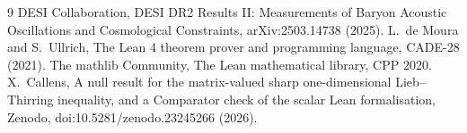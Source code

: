 \documentclass[11pt]{article}
\theoremstyle{remark}
\begin{document}
\begin{thebibliography}{9}
 DESI Collaboration, DESI DR2 Results II: Measurements of Baryon Acoustic Oscillations and Cosmological Constraints,
arXiv:2503.14738 (2025).
 L.~de Moura and S.~Ullrich, The Lean 4 theorem prover and programming language, CADE-28 (2021).
 The mathlib Community, The Lean mathematical library, CPP 2020.
 X.~Callens, A null result for the matrix-valued sharp one-dimensional Lieb--Thirring inequality, and a Comparator check of the scalar Lean formalisation, Zenodo, doi:10.5281/zenodo.23245266 (2026).
\end{thebibliography}
\end{document}
